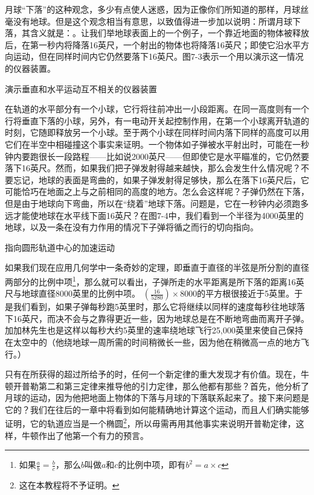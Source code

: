 \documentclass[12pt,oneside]{book}
\begin{document}
月球“下落”的这种观念，多少有点使人迷惑，因为正像你们所知道的那样，月球丝毫没有地球。但是这个观念相当有意思，以致值得进一步加以说明：所谓月球下落，其含义就是：。让我们举地球表面上的一个例子，一个靠近地面的物体被释放后，在第一秒内将降落16英尺，一个射出的物体也将降落16英尺；即使它沿水平方向运动，但在同样时间内它仍然要落下16英尺。图7-3表示一个用以演示这一情况的仪器装置。
\begin{fig}{演示垂直和水平运动互不相关的仪器装置}
\caption{\footnotesize 演示垂直和水平运动互不相关的仪器装置}
\label{fig:演示垂直和水平运动互不相关的仪器装置}
\end{fig}
在轨道的水平部分有一个小球，它行将往前冲出一小段距离。在同一高度则有一个行将垂直下落的小球，另外，有一电动开关起控制作用，在第一个小球离开轨道的时刻，它随即释放另一个小球。至于两个小球在同样时间内落下同样的高度可以用它们在半空中相碰撞这个事实来证明。一个物体如子弹被水平射出时，可能在一秒钟内要跑很长一段路程——比如说2000英尺——但即使它是水平瞄准的，它仍然要落下16英尺。然而，如果我们把子弹发射得越来越快，那么会发生什么情况呢？不要忘记，地球的表面是弯曲的，如果子弹发射得足够快，那么在落下16英尺后，它可能恰巧在地面之上与之前相同的高度的地方。怎么会这样呢？子弹仍然在下落，但是由于地球向下弯曲，所以在“绕着”地球下落。问题是，它在一秒钟内必须跑多远才能使地球在水平线下面16英尺？在图7-4中，我们看到一个半径为4000英里的地球，以及一条在没有力作用的情况下子弹将循之而行的切向指向。
\begin{fig}{指向圆形轨道中心的加速运动}
\caption{\footnotesize 指向圆形轨道中心的加速运动。根据平面几何，$x/S=(2R-S)/x\approx 2R/x$，其中$R$是地球的半径（4000英里），$x$是每秒“水平通过”的距离；$S$是每秒“下落”的距离（16英尺）}
\label{fig:指向圆形轨道中心的加速运动}
\end{fig}
如果我们现在应用几何学中一条奇妙的定理，即垂直于直径的半弦是所分割的直径两部分的比例中项\footnote{如果$\frac{a}{b}=\frac{b}{c}$，那么$b$叫做$a$和$c$的比例中项，即有$b^2=a \times c$}，那么就可以看出，子弹所走的水平距离是所下落的距离16英尺与地球直径8000英里的比例中项。
$(\frac{16}{5280})\times 8000$的平方根很接近于5英里。于是我们看到，如果子弹每秒跑5英里时，那么它将继续以同样的速度每秒往地球落下16英尺，而决不会与之靠得更近一些，因为地球总是在不断地弯曲而离开子弹。加加林先生也是这样以每秒大约5英里的速率绕地球飞行25,000英里来使自己保持在太空中的（他绕地球一周所需的时间稍微长一些，因为他在稍微高一点的地方飞行。）

只有在所获得的超过所给予的时，任何一个新定律的重大发现才有价值。现在，牛顿开普勒第二和第三定律来推导他的引力定律，那么他都有那些？首先，他分析了月球的运动，因为他把地面上物体的下落与月球的下落联系起来了。接下来问题是它的？我们在往后的一章中将看到如何能精确地计算这个运动，而且人们确实能够证明，它的轨道应当是一个椭圆\footnote{这在本教程将不予证明。}，所以毋需再用其他事实来说明开普勒定律，这样，牛顿作出了他第一个有力的预言。
\end{document}
